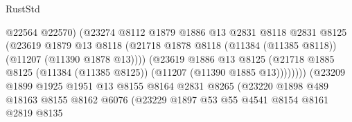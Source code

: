 \begin{lexlean}{RustStd}
\begin{coremodule}
                                          @22564
                                          @22570)
                                        (@23274
                                          @8112
                                          @1879
                                          @1886
                                          @13
                                          @2831
                                          @8118
                                          @2831
                                          @8125
                                          (@23619
                                            @1879
                                            @13
                                            @8118
                                            (@21718
                                              @1878
                                              @8118
                                              (@11384 (@11385 @8118))
                                              (@11207 (@11390 @1878 @13))))
                                          (@23619
                                            @1886
                                            @13
                                            @8125
                                            (@21718
                                              @1885
                                              @8125
                                              (@11384 (@11385 @8125))
                                              (@11207 (@11390 @1885 @13))))))))
                                  (@23209
                                    @1899
                                    @1925
                                    @1951
                                    @13
                                    @8155
                                    @8164
                                    @2831
                                    @8265
                                    (@23220
                                      @1898
                                      @489
                                      @18163
                                      @8155
                                      @8162
                                      @6076
                                      (@23229
                                        @1897
                                        @53
                                        @55
                                        @4541
                                        @8154
                                        @8161
                                        @2819
                                        @8135

\end{coremodule}
\end{lexlean}
